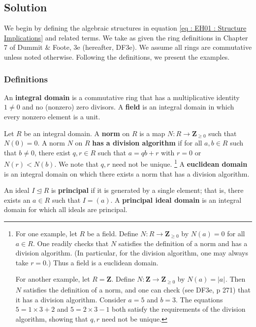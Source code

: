 \documentclass[oneside, english, 11pt]{article}
\newcommand{\spaceSolution}[2]{#2}
\newcommand{\spaceSolution}[2]{\vspace{#1}}
\newcommand{\fontDefWord}[1]{\textbf{#1}}
\newcommand{\abs}[2][]{\left|#2\right|_{#1}}
\newcommand{\idealeq}{\trianglelefteq}
\newcommand{\integers}{\mathbf{Z}}
\newcommand{\integersNonnegative}{\integers_{\geq 0}}
\newcommand{\Z}{\integers}
\begin{document}
\spaceSolution{0in}{%
\subsection*{Solution}

We begin by defining the algebraic structures in equation \eqref{eq : EH01 : Structure Implications} and related terms. We take as given the ring definitions in Chapter 7 of Dummit \&{} Foote, 3e (hereafter, DF3e). We assume all rings are commutative unless noted otherwise. Following the definitions, we present the examples.



\subsubsection*{Definitions}

An \fontDefWord{integral domain} is a commutative ring that has a multiplicative identity $1 \neq 0$ and no (nonzero) zero divisors. A \fontDefWord{field} is an integral domain in which every nonzero element is a unit.

Let $R$ be an integral domain. A \fontDefWord{norm} on $R$ is a map $N : R \rightarrow \integersNonnegative$ such that $N(0) = 0$. A norm $N$ on $R$ \fontDefWord{has a division algorithm} if for all $a, b \in R$ such that $b \neq 0$, there exist $q, r \in R$ such that $a = q b + r$ with $r = 0$ or $N(r) < N(b)$. We note that $q, r$ need not be unique.%
\footnote{For one example, let $R$ be a field. Define $N : R \rightarrow \integersNonnegative$ by $N(a) = 0$ for all $a \in R$. One readily checks that $N$ satisfies the definition of a norm and has a division algorithm. (In particular, for the division algorithm, one may always take $r = 0$.) Thus a field is a euclidean domain.

For another example, let $R = \Z$. Define $N : \Z \rightarrow \integersNonnegative$ by $N(a) = \abs{a}$. Then $N$ satisfies the definition of a norm, and one can check (see DF3e, p 271) that it has a division algorithm. Consider $a = 5$ and $b = 3$. The equations $5 = 1 \times 3 + 2$ and $5 = 2 \times 3 - 1$ both satisfy the requirements of the division algorithm, showing that $q, r$ need not be unique.} %
A \fontDefWord{euclidean domain} is an integral domain on which there exists a norm that has a division algorithm.

An ideal $I \idealeq R$ is \fontDefWord{principal} if it is generated by a single element; that is, there exists an $a \in R$ such that $I = (a)$. A \fontDefWord{principal ideal domain} is an integral domain for which all ideals are principal.

}
\end{document}
